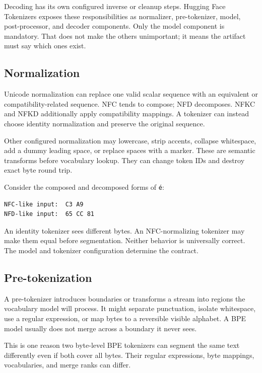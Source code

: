 Decoding has its own configured inverse or cleanup steps. Hugging Face
Tokenizers exposes these responsibilities as normalizer, pre-tokenizer,
model, post-processor, and decoder components. Only the model component
is mandatory. That does not make the others unimportant; it means the
artifact must say which ones exist.

\subsection{Normalization}\label{normalization}

Unicode normalization can replace one valid scalar sequence with an
equivalent or compatibility-related sequence. NFC tends to compose; NFD
decomposes. NFKC and NFKD additionally apply compatibility mappings. A
tokenizer can instead choose identity normalization and preserve the
original sequence.

Other configured normalization may lowercase, strip accents, collapse
whitespace, add a dummy leading space, or replace spaces with a marker.
These are semantic transforms before vocabulary lookup. They can change
token IDs and destroy exact byte round trip.

Consider the composed and decomposed forms of \texttt{é}:

\begin{verbatim}
NFC-like input:  C3 A9
NFD-like input:  65 CC 81
\end{verbatim}

An identity tokenizer sees different bytes. An NFC-normalizing tokenizer
may make them equal before segmentation. Neither behavior is universally
correct. The model and tokenizer configuration determine the contract.

\subsection{Pre-tokenization}\label{pre-tokenization}

A pre-tokenizer introduces boundaries or transforms a stream into
regions the vocabulary model will process. It might separate
punctuation, isolate whitespace, use a regular expression, or map bytes
to a reversible visible alphabet. A BPE model usually does not merge
across a boundary it never sees.

This is one reason two byte-level BPE tokenizers can segment the same
text differently even if both cover all bytes. Their regular
expressions, byte mappings, vocabularies, and merge ranks can differ.

